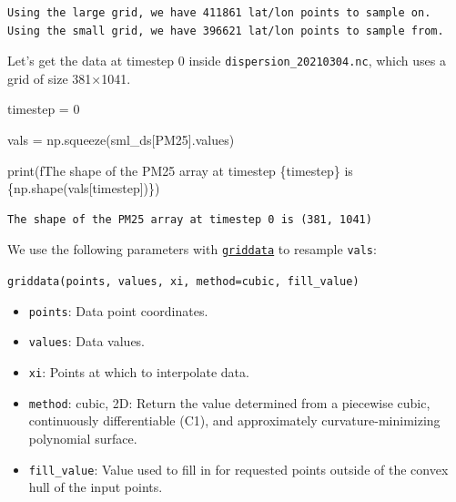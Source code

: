 \documentclass[
  letterpaper,
  DIV=11,
  numbers=noendperiod]{scrreprt}
\newenvironment{Shaded}{\begin{snugshade}}{\end{snugshade}}
\newcommand{\BuiltInTok}[1]{\textcolor[rgb]{0.00,0.23,0.31}{#1}}
\newcommand{\DecValTok}[1]{\textcolor[rgb]{0.68,0.00,0.00}{#1}}
\newcommand{\NormalTok}[1]{\textcolor[rgb]{0.00,0.23,0.31}{#1}}
\newcommand{\OperatorTok}[1]{\textcolor[rgb]{0.37,0.37,0.37}{#1}}
\newcommand{\SpecialCharTok}[1]{\textcolor[rgb]{0.37,0.37,0.37}{#1}}
\newcommand{\SpecialStringTok}[1]{\textcolor[rgb]{0.13,0.47,0.30}{#1}}
\newcommand{\StringTok}[1]{\textcolor[rgb]{0.13,0.47,0.30}{#1}}
\providecommand{\tightlist}{%
  \setlength{\itemsep}{0pt}\setlength{\parskip}{0pt}}\usepackage{longtable,booktabs,array}
\begin{document}
\begin{verbatim}
Using the large grid, we have 411861 lat/lon points to sample on.
Using the small grid, we have 396621 lat/lon points to sample from.
\end{verbatim}

Let's get the data at timestep 0 inside
\texttt{dispersion\_20210304.nc}, which uses a grid of size 381×1041.

\begin{Shaded}
\begin{Highlighting}[]
\NormalTok{timestep }\OperatorTok{=} \DecValTok{0}

\NormalTok{vals }\OperatorTok{=}\NormalTok{ np.squeeze(sml\_ds[}\StringTok{\textquotesingle{}PM25\textquotesingle{}}\NormalTok{].values)}

\BuiltInTok{print}\NormalTok{(}\SpecialStringTok{f\textquotesingle{}The shape of the PM25 array at timestep }\SpecialCharTok{\{}\NormalTok{timestep}\SpecialCharTok{\}}\SpecialStringTok{ is }\SpecialCharTok{\{}\NormalTok{np}\SpecialCharTok{.}\NormalTok{shape(vals[timestep])}\SpecialCharTok{\}}\SpecialStringTok{\textquotesingle{}}\NormalTok{)}
\end{Highlighting}
\end{Shaded}

\begin{verbatim}
The shape of the PM25 array at timestep 0 is (381, 1041)
\end{verbatim}

We use the following parameters with
\href{https://docs.scipy.org/doc/scipy/reference/generated/scipy.interpolate.griddata.html}{\texttt{griddata}}
to resample \texttt{vals}:

\texttt{griddata(points,\ values,\ xi,\ method=\textquotesingle{}cubic\textquotesingle{},\ fill\_value)}

\begin{itemize}
\tightlist
\item
  \texttt{points}: Data point coordinates.
\item
  \texttt{values}: Data values.
\item
  \texttt{xi}: Points at which to interpolate data.
\item
  \texttt{method}: cubic, 2D: Return the value determined from a
  piecewise cubic, continuously differentiable (C1), and approximately
  curvature-minimizing polynomial surface.
\item
  \texttt{fill\_value}: Value used to fill in for requested points
  outside of the convex hull of the input points.
\end{itemize}
\end{document}
